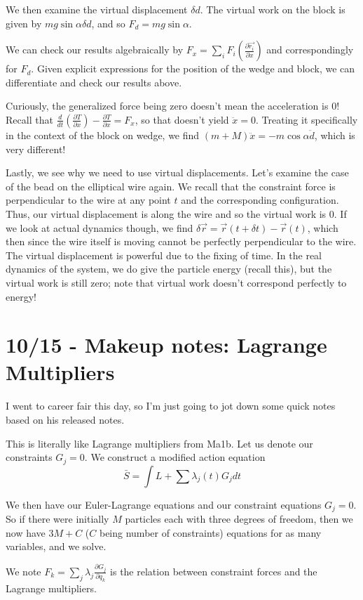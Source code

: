 \documentclass[10pt]{report}
\newcommand{\rd}[2]{\frac{d#1}{d#2}}
\newcommand{\pd}[2]{\frac{\partial #1}{\partial#2}}
\begin{document}
We then examine the virtual displacement $\delta d$. The virtual work on the block is given by $mg\sin \alpha \delta d$, and so $F_d = mg\sin\alpha$. 

We can check our results algebraically by $F_x = \sum_i F_i \left( \pd{\vec{r_i}}{x} \right)$ and correspondingly for $F_d$. Given explicit expressions for the position of the wedge and block, we can differentiate and check our results above.

Curiously, the generalized force being zero doesn't mean the acceleration is $0$! Recall that $\rd{}{t}\left( \pd{T}{x} \right) - \pd{T}{x} = F_x$, so that doesn't yield $\ddot{x} = 0$. Treating it specifically in the context of the block on wedge, we find $(m+M)\ddot{x} = -m\cos \alpha \ddot{d}$, which is very different!

Lastly, we see why we need to use virtual displacements. Let's examine the case of the bead on the elliptical wire again. We recall that the constraint force is perpendicular to the wire at any point $t$ and the corresponding configuration. Thus, our virtual displacement is along the wire and so the virtual work is $0$. If we look at actual dynamics though, we find $\delta \vec{r} = \vec{r}(t + \delta t) - \vec{r}(t)$, which then since the wire itself is moving cannot be perfectly perpendicular to the wire. The virtual displacement is powerful due to the fixing of time. In the real dynamics of the system, we do give the particle energy (recall this), but the virtual work is still zero; note that virtual work doesn't correspond perfectly to energy!

\chapter{10/15 - Makeup notes: Lagrange Multipliers}

I went to career fair this day, so I'm just going to jot down some quick notes based on his released notes.

This is literally like Lagrange multipliers from Ma1b. Let us denote our constraints $G_j = 0$. We construct a modified action equation
$$\bar{S} = \int L+\sum \lambda_j(t) G_j dt$$

We then have our Euler-Lagrange equations and our constraint equations $G_j = 0$. So if there were initially $M$ particles each with three degrees of freedom, then we now have $3M+C$ ($C$ being number of constraints) equations for as many variables, and we solve.

We note $F_k = \sum_j \lambda_j \pd{G_j}{q_k}$ is the relation between constraint forces and the Lagrange multipliers.
\end{document}
